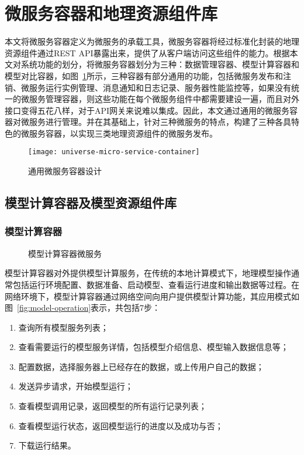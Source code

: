 \section{微服务容器和地理资源组件库}
本文将微服务容器定义为微服务的承载工具，微服务容器将经过标准化封装的地理资源组件通过REST API暴露出来，提供了从客户端访问这些组件的能力。根据本文对系统功能的划分，将微服务容器划分为三种：数据管理容器、模型计算容器和模型对比容器，如图~\ref{fig:universe-micro-service-container}所示，三种容器有部分通用的功能，包括微服务发布和注销、微服务运行实例管理、消息通知和日志记录、服务器性能监控等，如果没有统一的微服务管理容器，则这些功能在每个微服务组件中都需要建设一遍，而且对外接口变得五花八样，对于API网关来说难以集成。因此，本文通过通用的微服务容器对微服务进行管理。并在其基础上，针对三种微服务的特点，构建了三种各具特色的微服务容器，以实现三类地理资源组件的微服务发布。

\begin{figure}[!htbp]
    \centering
    \texttt{[image: universe-micro-service-container]}
    \caption{通用微服务容器设计}
    \label{fig:universe-micro-service-container}
\end{figure}

\subsection{模型计算容器及模型资源组件库}
\subsubsection{模型计算容器}
\begin{figure}[!htbp]
    \centering
    \hfill
    \caption{模型计算容器微服务}
    \label{fig:ms-server-microservice}
\end{figure}

模型计算容器对外提供模型计算服务，在传统的本地计算模式下，地理模型操作通常包括运行环境配置、数据准备、启动模型、查看运行进度和输出数据等过程。在网络环境下，模型计算容器通过网络空间向用户提供模型计算功能，其应用模式如图~\ref{fig:model-operation}表示，共包括7步：
\begin{enumerate}[(1)]
    \item 查询所有模型服务列表；
    \item 查看需要运行的模型服务详情，包括模型介绍信息、模型输入数据信息等；
    \item 配置数据，选择服务器上已经存在的数据，或上传用户自己的数据；
    \item 发送异步请求，开始模型运行；
    \item 查看模型调用记录，返回模型的所有运行记录列表；
    \item 查看模型运行状态，返回模型运行的进度以及成功与否；
    \item 下载运行结果。
\end{enumerate}

